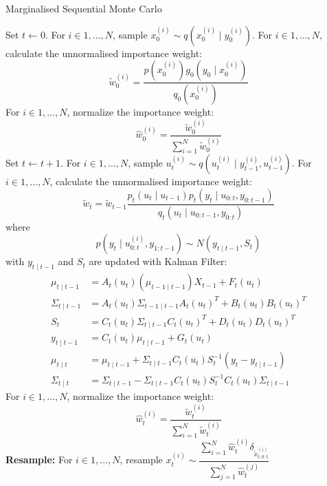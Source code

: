 \begin{algorithm}
\caption{Marginalised Sequential Monte Carlo}\label{algo:msmc}
\begin{algorithmic}[1]
\State Set $t \gets 0$.
\State For $i \in 1, \ldots, N$, sample $x^{(i)}_0 \sim q(x^{(i)}_0 \mid y^{(i)}_0)$.
\State For $i \in 1, \ldots, N$, calculate the unnormalised importance weight:
\begin{equation*}
 \tilde{w}^{(i)}_0 = \dfrac{p(x_0^{(i)})g_0(y_0 \mid x^{(i)}_0)}{q_0(x^{(i)}_0)}
\end{equation*}
\State For $i \in 1, \ldots, N$, normalize the importance weight:
\begin{equation*}
\hat{w}^{(i)}_0 = \dfrac{\tilde{w}^{(i)}_0}{\sum^N_{i=1} \tilde{w}^{(i)}_0}
\end{equation*}
\State Set $t \gets t + 1$.
\State For $i \in 1, \ldots, N$, sample $u^{(i)}_t \sim q(u^{(i)}_t \mid y^{(i)}_{t-1}, u^{(i)}_{t-1})$.
\State For $i \in 1, \ldots, N$, calculate the unnormalised importance weight:
\begin{equation*}
   \tilde{w}_t  = \tilde{w}_{t-1} \dfrac{p_t(u_t \mid u_{t-1})p_t(y_t \mid u_{0:t}, y_{0:t-1})}{q_t(u_t \mid u_{0:t-1}, y_{0:t})}
\end{equation*}
where
\begin{equation}
  p(y_t \mid u^{(i)}_{0:t}, y_{1:t-1}) \sim N(y_{t \mid t-1},S_t)
\end{equation}
with $y_{t \mid t-1}$ and $S_t$ are updated with Kalman Filter:
\begin{align}
  \mu_{t \mid t -1} &= A_{t}(u_t)(\mu_{t-1 \mid t-1})X_{t-1} + F_t(u_t) \nonumber \\
  \Sigma_{t \mid t -1} &= A_{t}(u_t)\Sigma_{t -1 \mid t -1}A_{t}(u_t)^T +  B_t(u_t)B_t(u_t)^T \nonumber\\
  S_t &=  C_{t}(u_t)\Sigma_{t \mid t -1}C_{t}(u_t)^T +  D_t(u_t)D_t(u_t)^T \nonumber\\
  y_{t \mid t-1} &=  C_{t}(u_t)  \mu_{t \mid t-1} + G_t(u_t) \nonumber\\
  \mu_{t \mid t} &=   \mu_{t \mid t -1} +   \Sigma_{t \mid t -1} C_{t}(u_t)S_t^{-1}(y_t - y_{t \mid t-1}) \nonumber\\
  \Sigma_{t \mid t} &=  \Sigma_{t \mid t -1} -\Sigma_{t \mid t -1} C_{t}(u_t)S_t^{-1} C_{t}(u_t)\Sigma_{t \nonumber \mid t -1}
\end{align}
\State For $i \in 1, \ldots, N$, normalize the importance weight:
\begin{equation*}
\hat{w}^{(i)}_t = \dfrac{\tilde{w}^{(i)}_t}{\sum^N_{i=1} \tilde{w}^{(i)}_t}
\end{equation*}
\State \textbf{Resample:} For $i \in 1, \ldots, N$, resample $ x^{(i)}_t \sim \dfrac{\sum^N_{i=1}\hat{w}^{(i)}_t\delta_{\tilde{x}^{(i)}_{t,0:t}}}{\sum^N_{j=1} \hat{w}^{(j)}_t}$
\EndWhile
\EndFunction
\end{algorithmic}
\end{algorithm}

